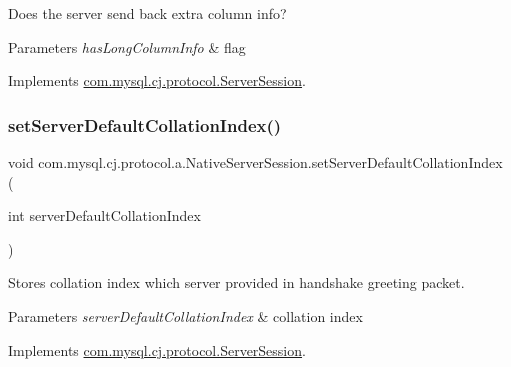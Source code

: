Does the server send back extra column info?


\begin{DoxyParams}{Parameters}
{\em has\+Long\+Column\+Info} & flag \\
\hline
\end{DoxyParams}


Implements \mbox{\hyperlink{interfacecom_1_1mysql_1_1cj_1_1protocol_1_1_server_session_a004d9939fa7471ce08e0b404363642fc}{com.\+mysql.\+cj.\+protocol.\+Server\+Session}}.

\mbox{\label{classcom_1_1mysql_1_1cj_1_1protocol_1_1a_1_1_native_server_session_abd6266538f2562073361edbc958a3304}} 
\subsubsection{\texorpdfstring{set\+Server\+Default\+Collation\+Index()}{setServerDefaultCollationIndex()}}
{\footnotesize\ttfamily void com.\+mysql.\+cj.\+protocol.\+a.\+Native\+Server\+Session.\+set\+Server\+Default\+Collation\+Index (\begin{DoxyParamCaption}\item[{int}]{server\+Default\+Collation\+Index }\end{DoxyParamCaption})}

Stores collation index which server provided in handshake greeting packet.


\begin{DoxyParams}{Parameters}
{\em server\+Default\+Collation\+Index} & collation index \\
\hline
\end{DoxyParams}


Implements \mbox{\hyperlink{interfacecom_1_1mysql_1_1cj_1_1protocol_1_1_server_session_aa712ac71a0771a45a3f8b46ceaac4178}{com.\+mysql.\+cj.\+protocol.\+Server\+Session}}.

\mbox{\label{classcom_1_1mysql_1_1cj_1_1protocol_1_1a_1_1_native_server_session_ad533b5d433cde1b38176e2718308c7a4}} 

